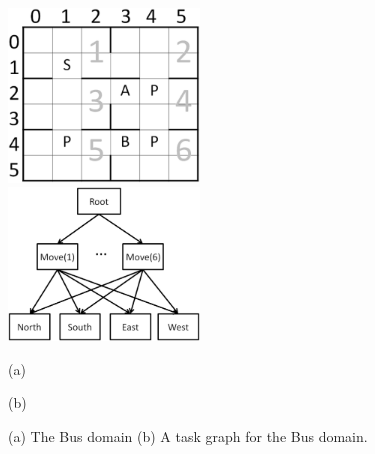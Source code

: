 \begin{figure}[t]
 \begin{minipage}[b]{0.5\linewidth}
    \begin{center}
    \includegraphics[width=2.0in] {./figures/BusSmall.eps}
\end{center}
\end{minipage}
\begin{minipage}[b]{0.5\linewidth}
    \begin{center}
    \includegraphics[width=2.0in] {./figures/BusHierarchy.eps}
\end{center}
\end{minipage}
\begin{minipage}[b]{0.5\linewidth} \centering (a) \end{minipage}
\begin{minipage}[b]{0.5\linewidth} \centering (b) \end{minipage}

\caption{(a) The Bus domain (b) A task graph for the Bus domain.}
\label{fig:bus}
\end{figure}

